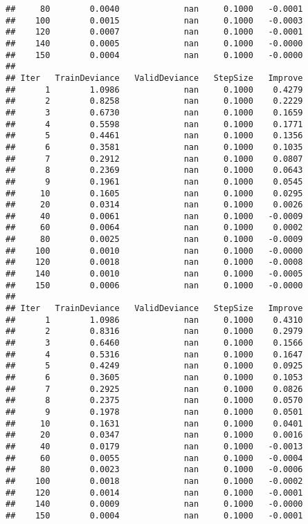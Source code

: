 \documentclass[
]{article}
\begin{document}
\begin{verbatim}
##     80        0.0040             nan     0.1000   -0.0001
##    100        0.0015             nan     0.1000   -0.0003
##    120        0.0007             nan     0.1000   -0.0001
##    140        0.0005             nan     0.1000   -0.0000
##    150        0.0004             nan     0.1000   -0.0000
## 
## Iter   TrainDeviance   ValidDeviance   StepSize   Improve
##      1        1.0986             nan     0.1000    0.4279
##      2        0.8258             nan     0.1000    0.2229
##      3        0.6730             nan     0.1000    0.1659
##      4        0.5598             nan     0.1000    0.1771
##      5        0.4461             nan     0.1000    0.1356
##      6        0.3581             nan     0.1000    0.1035
##      7        0.2912             nan     0.1000    0.0807
##      8        0.2369             nan     0.1000    0.0643
##      9        0.1961             nan     0.1000    0.0545
##     10        0.1605             nan     0.1000    0.0295
##     20        0.0314             nan     0.1000    0.0026
##     40        0.0061             nan     0.1000   -0.0009
##     60        0.0064             nan     0.1000    0.0002
##     80        0.0025             nan     0.1000   -0.0009
##    100        0.0010             nan     0.1000   -0.0000
##    120        0.0018             nan     0.1000   -0.0008
##    140        0.0010             nan     0.1000   -0.0005
##    150        0.0006             nan     0.1000   -0.0000
## 
## Iter   TrainDeviance   ValidDeviance   StepSize   Improve
##      1        1.0986             nan     0.1000    0.4310
##      2        0.8316             nan     0.1000    0.2979
##      3        0.6460             nan     0.1000    0.1566
##      4        0.5316             nan     0.1000    0.1647
##      5        0.4249             nan     0.1000    0.0925
##      6        0.3605             nan     0.1000    0.1053
##      7        0.2925             nan     0.1000    0.0826
##      8        0.2375             nan     0.1000    0.0570
##      9        0.1978             nan     0.1000    0.0501
##     10        0.1631             nan     0.1000    0.0401
##     20        0.0347             nan     0.1000    0.0016
##     40        0.0179             nan     0.1000   -0.0013
##     60        0.0055             nan     0.1000   -0.0004
##     80        0.0023             nan     0.1000   -0.0006
##    100        0.0018             nan     0.1000   -0.0002
##    120        0.0014             nan     0.1000   -0.0001
##    140        0.0009             nan     0.1000   -0.0000
##    150        0.0004             nan     0.1000   -0.0001

\end{verbatim}
\end{document}
